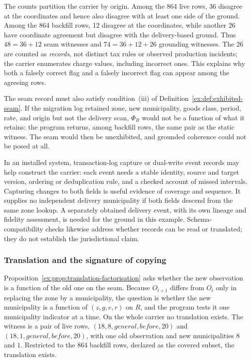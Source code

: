 \documentclass[11pt]{article}
\theoremstyle{definition}
\begin{document}
The counts partition the carrier by origin. Among the 864 live rows, 36 disagree at the coordinates and hence also disagree with at least one side of the ground. Among the 864 backfill rows, 12 disagree at the coordinates, while another 26 have coordinate agreement but disagree with the delivery-based ground. Thus $48=36+12$ seam witnesses and $74=36+12+26$ grounding witnesses. The 26 are counted as \emph{records}, not distinct tax rules or observed production incidents; the carrier enumerates charge values, including incorrect ones. This explains why both a falsely correct flag and a falsely incorrect flag can appear among the agreeing rows.

The seam record must also satisfy condition~(iii) of Definition~\ref{ex:def:exhibited-seam}. If the migration log retained zone, new municipality, goods class, period, rate, and origin but not the delivery scan, $\Phi_R$ would not be a function of what it retains: the program returns, among backfill rows, the same pair as the static witness. The seam would then be unexhibited, and grounded coherence could not be posed at all.

In an installed system, transaction-log capture or dual-write event records may help construct the carrier: each event needs a stable identity, source and target version, ordering or deduplication rule, and a checked account of missed intervals. Capturing changes to both fields is useful evidence of coverage and sequence. It supplies no independent delivery municipality if both fields descend from the same zone lookup. A separately obtained delivery event, with its own lineage and fidelity assessment, is needed for the ground in this example. Schema-compatibility checks likewise address whether records can be read or translated; they do not establish the jurisdictional claim.

\subsubsection{Translation and the signature of copying}

Proposition~\ref{ex:prop:translation-factorisation} asks whether the new observation is a function of the old one on the seam. Because $O_{t+1}$ differs from $O_t$ only in replacing the zone by a municipality, the question is whether the new municipality is a function of $(z,g,e,r)$ on $R$, and the program tests it one municipality indicator at a time. On the whole carrier no translation exists. The witness is a pair of live rows, $(18,8,\mathit{general},\mathit{before},20)$ and $(18,1,\mathit{general},\mathit{before},20)$, with one old observation and new municipalities $8$ and $1$. Restricted to the 864 backfill rows, declared as the covered subset, the translation exists.
\end{document}
